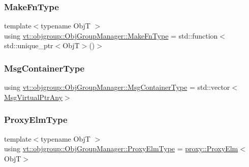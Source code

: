 \mbox{\label{structvt_1_1objgroup_1_1_obj_group_manager_a397d787b3876752a6d70511b2769b872}} 
\subsubsection{\texorpdfstring{Make\+Fn\+Type}{MakeFnType}}
{\footnotesize\ttfamily template$<$typename ObjT $>$ \\
using \hyperlink{structvt_1_1objgroup_1_1_obj_group_manager_a397d787b3876752a6d70511b2769b872}{vt\+::objgroup\+::\+Obj\+Group\+Manager\+::\+Make\+Fn\+Type} =  std\+::function$<$std\+::unique\+\_\+ptr$<$ObjT$>$()$>$}

\mbox{\label{structvt_1_1objgroup_1_1_obj_group_manager_a1c15dbd443c4cfae515ca3587f93a2b8}} 
\subsubsection{\texorpdfstring{Msg\+Container\+Type}{MsgContainerType}}
{\footnotesize\ttfamily using \hyperlink{structvt_1_1objgroup_1_1_obj_group_manager_a1c15dbd443c4cfae515ca3587f93a2b8}{vt\+::objgroup\+::\+Obj\+Group\+Manager\+::\+Msg\+Container\+Type} =  std\+::vector$<$\hyperlink{namespacevt_a54674b9f819f4f3a652c6f78d9b62aaf}{Msg\+Virtual\+Ptr\+Any}$>$}

\mbox{\label{structvt_1_1objgroup_1_1_obj_group_manager_adba6c8ecb0f4c30e719f1abb995cfc9b}} 
\subsubsection{\texorpdfstring{Proxy\+Elm\+Type}{ProxyElmType}}
{\footnotesize\ttfamily template$<$typename ObjT $>$ \\
using \hyperlink{structvt_1_1objgroup_1_1_obj_group_manager_adba6c8ecb0f4c30e719f1abb995cfc9b}{vt\+::objgroup\+::\+Obj\+Group\+Manager\+::\+Proxy\+Elm\+Type} =  \hyperlink{structvt_1_1objgroup_1_1proxy_1_1_proxy_elm}{proxy\+::\+Proxy\+Elm}$<$ObjT$>$}

